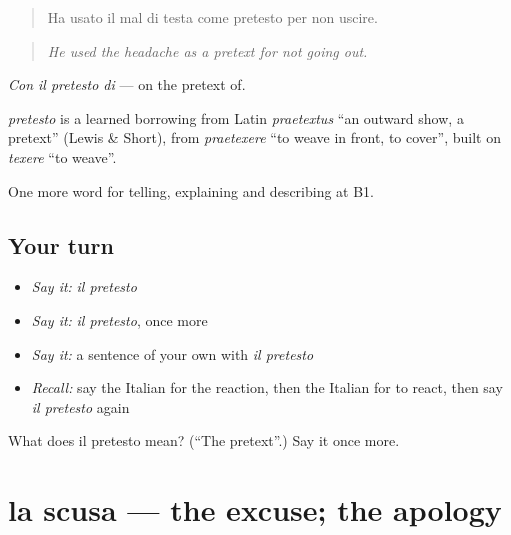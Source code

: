 \begin{quote}
Ha usato il mal di testa come pretesto per non uscire.
\end{quote}

\begin{quote}
\emph{He used the headache as a pretext for not going out.}
\end{quote}

\emph{Con il pretesto di} — on the pretext of.

\begin{cousinweb}
\emph{pretesto} is a learned borrowing from Latin \emph{praetextus} \textquotedblleft{}an outward show, a pretext\textquotedblright{} (Lewis \& Short), from \emph{praetexere} \textquotedblleft{}to weave in front, to cover\textquotedblright{}, built on \emph{texere} \textquotedblleft{}to weave\textquotedblright{}.
\end{cousinweb}

\begin{grammarlens}[title={What you've built}]
One more word for telling, explaining and describing at B1.
\end{grammarlens}

\subsection*{Your turn}
\begin{itemize}
\raggedright
  \item \emph{Say it:} \emph{il pretesto}
  \item \emph{Say it:} \emph{il pretesto}, once more
  \item \emph{Say it:} a sentence of your own with \emph{il pretesto}
  \item \emph{Recall:} say the Italian for the reaction, then the Italian for to react, then say \emph{il pretesto} again
\end{itemize}

\begin{tcolorbox}[breakable,colback=teal!4,colframe=teal!35!black,title={Before you move on}]
What does il pretesto mean? (\textquotedblleft{}The pretext\textquotedblright{}.) Say it once more.
\end{tcolorbox}
\section[la scusa]{la scusa — the excuse; the apology}

\label{lesson:IT-C353-scusa}



